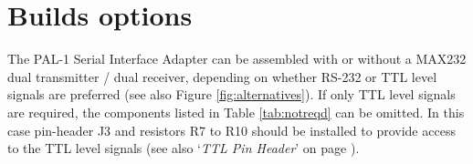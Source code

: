 \documentclass[a4paper,11pt,twoside,openright]{report}
\begin{document}

\section*{Builds options}
The PAL-1 Serial Interface Adapter can be assembled with or without a MAX232 dual transmitter / dual receiver, depending on whether RS-232 or TTL level signals are preferred (see also Figure \ref{fig:alternatives}).  If only TTL level signals are required, the components listed in Table \ref{tab:notreqd} can be omitted. In this case pin-header J3 and resistors R7 to R10 should be installed to provide access to the TTL level signals (see also `\textit{TTL Pin Header}' on page \pageref{sec:ttlpins}).
\end{document}
